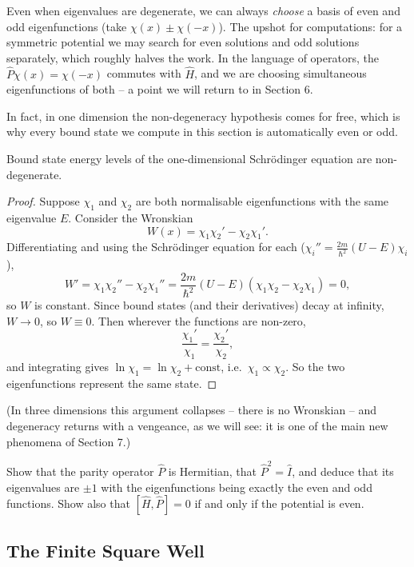 Even when eigenvalues are degenerate, we can always \emph{choose} a basis of even and odd eigenfunctions (take $\chi(x) \pm \chi(-x)$). The upshot for computations: for a symmetric potential we may search for even solutions and odd solutions separately, which roughly halves the work. In the language of operators, the  $\hat{P} \chi(x) = \chi(-x)$ commutes with $\hat{H}$, and we are choosing simultaneous eigenfunctions of both -- a point we will return to in Section 6.

In fact, in one dimension the non-degeneracy hypothesis comes for free, which is why every bound state we compute in this section is automatically even or odd.

\begin{proposition}
    Bound state energy levels of the one-dimensional Schr\"odinger equation are non-degenerate.
\end{proposition}
\begin{proof}
    Suppose $\chi_1$ and $\chi_2$ are both normalisable eigenfunctions with the same eigenvalue $E$. Consider the Wronskian
    $$
    W(x) = \chi_1 \chi_2' - \chi_2 \chi_1'.
    $$
    Differentiating and using the Schr\"odinger equation for each ($\chi_i'' = \frac{2m}{\hbar^2}(U - E)\chi_i$),
    $$
    W' = \chi_1 \chi_2'' - \chi_2 \chi_1'' = \frac{2m}{\hbar^2}(U - E)(\chi_1 \chi_2 - \chi_2 \chi_1) = 0,
    $$
    so $W$ is constant. Since bound states (and their derivatives) decay at infinity, $W \rightarrow 0$, so $W \equiv 0$. Then wherever the functions are non-zero,
    $$
    \frac{\chi_1'}{\chi_1} = \frac{\chi_2'}{\chi_2},
    $$
    and integrating gives $\ln \chi_1 = \ln \chi_2 + \text{const}$, i.e.\ $\chi_1 \propto \chi_2$. So the two eigenfunctions represent the same state.
\end{proof}

(In three dimensions this argument collapses -- there is no Wronskian -- and degeneracy returns with a vengeance, as we will see: it is one of the main new phenomena of Section 7.)

\begin{exercise}
    Show that the parity operator $\hat{P}$ is Hermitian, that $\hat{P}^2 = \hat{I}$, and deduce that its eigenvalues are $\pm 1$ with the eigenfunctions being exactly the even and odd functions. Show also that $[\hat{H}, \hat{P}] = 0$ if and only if the potential is even.
\end{exercise}

\subsection{The Finite Square Well}

